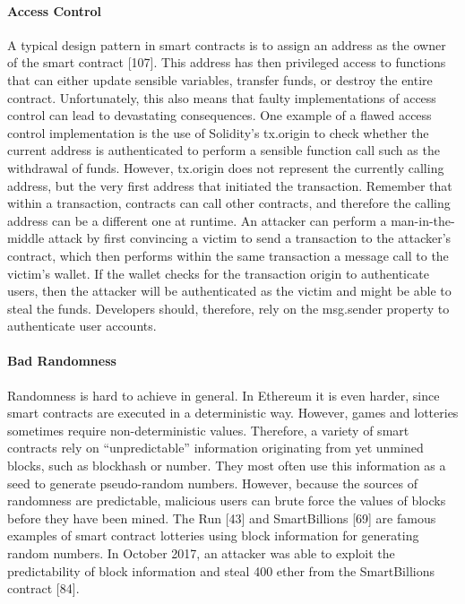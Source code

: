        \paragraph{Access Control}
            A typical design pattern in smart contracts is to assign an address as the owner of the smart contract [107].
            This address has then privileged access to functions that can either update sensible variables, transfer funds, or destroy the entire contract.
            Unfortunately, this also means that faulty implementations of access control can lead to devastating consequences. One example of a flawed access control implementation is the use of Solidity's tx.origin to check whether the current address is authenticated to perform a sensible function call such as the withdrawal of funds.
            However, tx.origin does not represent the currently calling address, but the very first address that initiated the transaction.
            Remember that within a transaction, contracts can call other contracts, and therefore the calling address can be a different one at runtime.
            An attacker can perform a man-in-the-middle attack by first convincing a victim to send a transaction to the attacker’s contract, which then performs within the same transaction a message call to the victim’s wallet.
            If the wallet checks for the transaction origin to authenticate users, then the attacker will be authenticated as the victim and might be able to steal the funds.
            Developers should, therefore, rely on the msg.sender property to authenticate user accounts.
        \paragraph{Bad Randomness}
            Randomness is hard to achieve in general. In Ethereum it is even harder, since smart contracts are executed in a deterministic way. However, games and lotteries sometimes require non-deterministic values. Therefore, a variety of smart contracts rely on “unpredictable” information originating from yet unmined blocks, such as blockhash or number. They most often use this information as a seed to generate pseudo-random numbers. However, because the sources of randomness are predictable, malicious users can brute force the values of blocks before they have been mined.
            The Run [43] and SmartBillions [69] are famous examples of smart contract lotteries using block information for generating random numbers.
            In October 2017, an attacker was able to exploit the predictability of block information and steal 400 ether from the SmartBillions contract [84].
